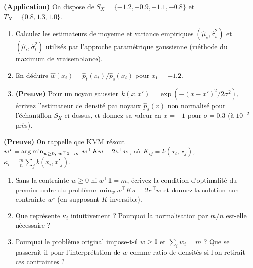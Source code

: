 \documentclass[11pt]{article}
\begin{document}
\begin{exercise} \textbf{(Application)}
On dispose de $S_X = \{-1.2, -0.9, -1.1, -0.8\}$ et $T_X=\{0.8, 1.3, 1.0\}$.
\begin{enumerate}[label=(\alph*)]
\item Calculez les estimateurs de moyenne et variance empiriques $(\hat\mu_s,\hat\sigma_s^2)$ et
$(\hat\mu_t,\hat\sigma_t^2)$ utilisés par l'approche paramétrique gaussienne (méthode du maximum de
vraisemblance).
\item En déduire $\hat w(x_i) = \hat p_t(x_i)/\hat p_s(x_i)$ pour $x_1=-1.2$.
\item \textbf{(Preuve)} Pour un noyau gaussien $k(x,x')=\exp(-(x-x')^2/2\sigma^2)$, écrivez l'estimateur
de densité par noyaux $\hat p_s(x)$ non normalisé pour l'échantillon $S_X$ ci-dessus, et donnez sa valeur
en $x=-1$ pour $\sigma=0.3$ (à $10^{-2}$ près).
\end{enumerate}
\end{exercise}

\begin{exercise} \textbf{(Preuve)}
\label{ex:kmm}
On rappelle que KMM résout $w^\star = \operatorname*{arg\,min}_{w\ge0,\ w^\top\mathbf 1 = m}\ w^\top K w - 2\kappa^\top w$,
où $K_{ij}=k(x_i,x_j)$, $\kappa_i = \frac{m}{n}\sum_{j} k(x_i,x'_j)$.
\begin{enumerate}[label=(\alph*)]
\item Sans la contrainte $w\ge 0$ ni $w^\top\mathbf1=m$, écrivez la condition d'optimalité du premier
ordre du problème $\min_w w^\top K w - 2\kappa^\top w$ et donnez la solution non contrainte $w^\star$
(en supposant $K$ inversible).
\item Que représente $\kappa_i$ intuitivement ? Pourquoi la normalisation par $m/n$ est-elle nécessaire ?
\item Pourquoi le problème original impose-t-il $w\ge 0$ et $\sum_i w_i = m$ ? Que se passerait-il pour
l'interprétation de $w$ comme ratio de densités si l'on retirait ces contraintes ?
\end{enumerate}
\end{exercise}
\end{document}
